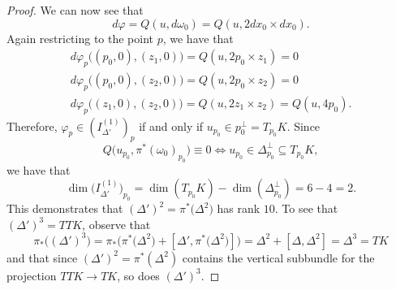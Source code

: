 \documentclass[10pt,a4paper]{amsart}
\begin{document}
\begin{proof}
    We can now see that
    \begin{equation}
        d\varphi = Q(u,d\omega_0) = Q(u,2dx_0\times dx_0).
    \end{equation}
    Again restricting to the point $p$, we have that 
    \begin{gather}
        d\varphi_{p}\big((p_0,0),(z_1,0)) = Q(u,2p_0\times z_1) = 0
        \\
        d\varphi_{p}\big((p_0,0),(z_2,0)) = Q(u,2p_0\times z_2) = 0
        \\
        d\varphi_{p}\big((z_1,0),(z_2,0)) = Q(u,2z_1\times z_2) = Q(u,4p_0).
    \end{gather}
    Therefore, $\varphi_{p}\in (I_{\Delta'}^{(1)})_p$ if and only if $u_{p_0}\in p_0^\perp = T_{p_0}K$. Since 
    \[
        Q\big(u_{p_0},\pi^*(\omega_0)_{p_0}\big) \equiv 0\Longleftrightarrow u_{p_0}\in \Delta^\perp_{p_0}\subseteq T_{p_0}K,
    \]
    we have that
    \begin{equation}
        \dim\big(I_{\Delta'}^{(1)}\big)_{p_0} = \dim(T_{p_0}K) - \dim(\Delta_{p_0}^\perp) = 6-4 = 2.
    \end{equation}
    This demonstrates that $(\Delta')^2 = \pi^*\big(\Delta^2\big)$ has rank $10$. To see that $(\Delta')^3 = TTK$, observe that
    \begin{equation}
        \pi_*\big((\Delta')^{3}\big) = \pi_*\big(\pi^*\big(\Delta^2\big) + [\Delta',\pi^*\big(\Delta^2\big)]\big) = \Delta^2 + [\Delta, \Delta^2] = \Delta^3 = TK
    \end{equation}
    and that since $(\Delta')^2 = \pi^*(\Delta^2)$ contains the vertical subbundle for the projection $TTK\to TK$, so does $(\Delta')^3$.
\end{proof}
\end{document}
